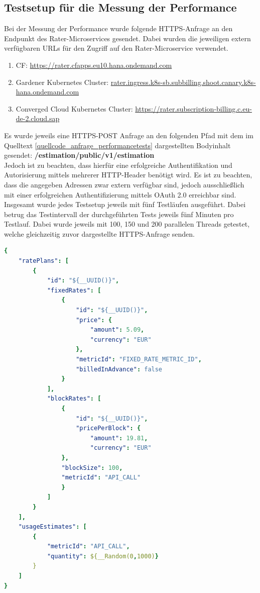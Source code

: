 \subsection{Testsetup für die Messung der Performance}
\label{anhang_performancetests}
Bei der Messung der Performance wurde folgende \ac{HTTPS}-Anfrage an den Endpunkt des Rater-Microservices gesendet. Dabei wurden die jeweiligen extern verfügbaren \acsp{URL} für den Zugriff auf den Rater-Microservice verwendet.\\
\begin{enumerate}
	\item \ac{CF}: \url{https://rater.cfapps.eu10.hana.ondemand.com}
	\item Gardener Kubernetes Cluster: \url{rater.ingress.k8s-sb.subbilling.shoot.canary.k8s-hana.ondemand.com}
	\item Converged Cloud Kubernetes Cluster: \url{https://rater.subscription-billing.c.eu-de-2.cloud.sap}
\end{enumerate}
Es wurde jeweils eine \ac{HTTPS}-POST Anfrage an den folgenden Pfad  mit dem im Quelltext \ref{quellcode_anfrage_performancetests} dargestellten Bodyinhalt gesendet: \textbf{/estimation/public/v1/estimation}\\
Jedoch ist zu beachten, dass hierfür eine erfolgreiche Authentifikation und Autorisierung mittels mehrerer \ac{HTTP}-Header benötigt wird. Es ist zu beachten, dass die angegeben Adressen zwar extern verfügbar sind, jedoch ausschließlich mit einer erfolgreichen Authentifizierung mittels OAuth 2.0 erreichbar sind.\\
Insgesamt wurde jedes Testsetup jeweils mit fünf Testläufen ausgeführt. Dabei betrug das Testintervall der durchgeführten Tests jeweils fünf Minuten pro Testlauf. Dabei wurde jeweils mit 100, 150 und 200 parallelen Threads getestet, welche gleichzeitig zuvor dargestellte \ac{HTTPS}-Anfrage senden.
\newpage
\begin{lstlisting}[language=yaml, caption=Verwendete \acl{HTTPS}-Anfrage für die Messung der Performance, label=quellcode_anfrage_performancetests]
{
	"ratePlans": [
		{
			"id": "${__UUID()}",
			"fixedRates": [
				{
					"id": "${__UUID()}",
					"price": {
						"amount": 5.09,
						"currency": "EUR"
					},
					"metricId": "FIXED_RATE_METRIC_ID",
					"billedInAdvance": false
				}
			],
			"blockRates": [
				{
					"id": "${__UUID()}",
					"pricePerBlock": {
						"amount": 19.81,
						"currency": "EUR"
				},
				"blockSize": 100,
				"metricId": "API_CALL"
				}
			]
		}
	],
	"usageEstimates": [
		{
			"metricId": "API_CALL",
			"quantity": ${__Random(0,1000)}
		}
	]
}
\end{lstlisting}
\newpage
